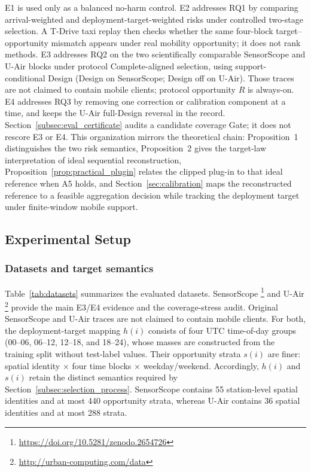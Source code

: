 \documentclass[letterpaper,journal]{IEEEtran}
\begin{document}
E1 is used only as a balanced no-harm control.  E2 addresses RQ1 by comparing
arrival-weighted and deployment-target-weighted risks under controlled
two-stage selection.  A T-Drive taxi replay then checks whether the same
four-block target--opportunity mismatch appears under real mobility
opportunity; it does not rank methods.  E3 addresses RQ2 on the two scientifically comparable
SensorScope and U-Air blocks under protocol Complete-aligned selection,
using support-conditional Design
(Design on SensorScope; Design off on U-Air).  Those traces are not claimed
to contain mobile clients; protocol opportunity $R$ is always-on.  E4 addresses RQ3 by
removing one correction or calibration component at a time, and keeps
the U-Air full-Design reversal in the record.  Section~\ref{subsec:eval_certificate}
audits a candidate coverage Gate; it does not rescore E3 or E4.
This organization mirrors the
theoretical chain: Proposition~1 distinguishes the two risk semantics,
Proposition~2 gives the target-law interpretation of ideal sequential
reconstruction, Proposition~\ref{prop:practical_plugin} relates the
clipped plug-in to that ideal reference when A5 holds, and
Section~\ref{sec:calibration} maps the reconstructed reference to a feasible
aggregation decision while tracking the deployment target under finite-window
mobile support.

\subsection{Experimental Setup}
\label{subsec:eval_setup}

\subsubsection{Datasets and target semantics}

Table~\ref{tab:datasets} summarizes the evaluated datasets.  SensorScope
\cite{ingelrest2010sensorscope,barrenetxea2019sensorscope}\footnote{\url{https://doi.org/10.5281/zenodo.2654726}}
and U-Air
\cite{zheng2013uair}\footnote{\url{http://urban-computing.com/data}}
provide the main E3/E4 evidence and the coverage-stress audit.
Original SensorScope and U-Air traces are not claimed to contain mobile
clients.  For both, the deployment-target mapping
$h(i)$ consists of four UTC time-of-day groups
(00--06, 06--12, 12--18, and 18--24), whose masses are constructed from the training
split without test-label values.  Their opportunity strata $s(i)$ are finer:
spatial identity $\times$ four time blocks $\times$ weekday/weekend.
Accordingly, $h(i)$ and $s(i)$ retain the distinct semantics required by
Section~\ref{subsec:selection_process}.  SensorScope contains 55 station-level
spatial identities and at most 440 opportunity strata, whereas U-Air contains
36 spatial identities and at most 288 strata.
\end{document}
